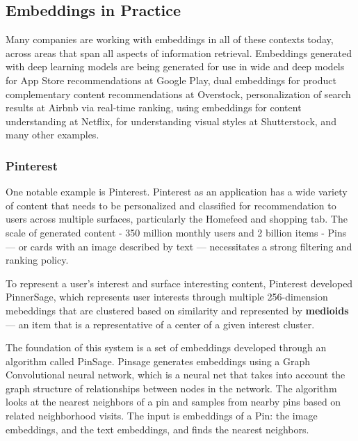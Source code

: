 \documentclass[11pt, table]{diazessay} %
\begin{document}
\begin{sloppypar}
\subsection{Embeddings in Practice}

Many companies are working with embeddings in all of these contexts today, across areas that span all aspects of information retrieval. Embeddings generated with deep learning models are being generated for use in wide and deep models for App Store recommendations at Google Play\citep{zhang2019deep}, dual embeddings for product complementary content recommendations at Overstock\citep{kvernadze2022two}, personalization of search results at Airbnb via real-time ranking\citep{grbovic2018real}, using embeddings for content understanding at Netflix\citep{dye_ekandham_saluja_rastogi_2020}, for understanding visual styles at Shutterstock\citep{gomez2022learning}, and many other examples.

\subsubsection{Pinterest}

One notable example is Pinterest. Pinterest as an application has a wide variety of content that needs to be personalized and classified for recommendation to users across multiple surfaces, particularly the Homefeed and shopping tab. The scale of generated content - 350 million monthly users and 2 billion items - Pins --- or cards with an image described by text --- necessitates a strong filtering and ranking policy. 

To represent a user's interest and surface interesting content, Pinterest developed PinnerSage\citep{pal2020pinnersage}, which represents user interests through multiple 256-dimension mebeddings that are clustered based on similarity and represented by \textbf{medioids} --- an item that is a representative of a center of a given interest cluster. 

The foundation of this system is a set of embeddings developed through an algorithm called PinSage\citep{ying2018graph}. Pinsage generates embeddings using a Graph Convolutional neural network, which is a neural net that takes into account the graph structure of relationships between nodes in the network. The algorithm looks at the nearest neighbors of a pin and samples from nearby pins based on related neighborhood visits. The input is embeddings of a Pin: the image embeddings, and the text embeddings, and finds the nearest neighbors. 


\end{sloppypar}
\end{document}
